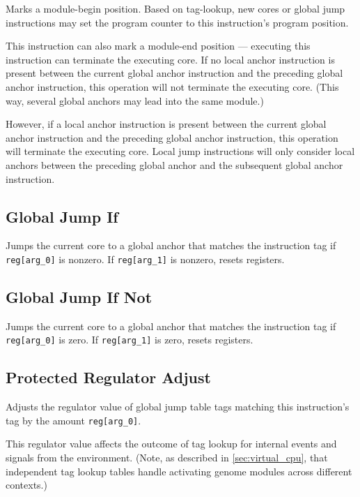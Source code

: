 
Marks a module-begin position.
Based on tag-lookup, new cores or global jump instructions may set the program counter to this instruction's program position.

This instruction can also mark a module-end position --- executing this instruction can terminate the executing core.
If no local anchor instruction is present between the current global anchor instruction and the preceding global anchor instruction, this operation will not terminate the executing core.
(This way, several global anchors may lead into the same module.)

However, if a local anchor instruction is present between the current global anchor instruction and the preceding global anchor instruction, this operation will terminate the executing core.
Local jump instructions will only consider local anchors between the preceding global anchor and the subsequent global anchor instruction.

\subsection{Global Jump If}


Jumps the current core to a global anchor that matches the instruction tag if \texttt{reg[arg\_0]} is nonzero.
If \texttt{reg[arg\_1]} is nonzero, resets registers.

\subsection{Global Jump If Not}


Jumps the current core to a global anchor that matches the instruction tag if \texttt{reg[arg\_0]} is zero.
If \texttt{reg[arg\_1]} is zero, resets registers.

\subsection{Protected Regulator Adjust}


Adjusts the regulator value of global jump table tags matching this instruction's tag by the amount \texttt{reg[arg\_0]}.

This regulator value affects the outcome of tag lookup for internal events and signals from the environment.
(Note, as described in \ref{sec:virtual_cpu}, that independent tag lookup tables handle activating genome modules across different contexts.)

